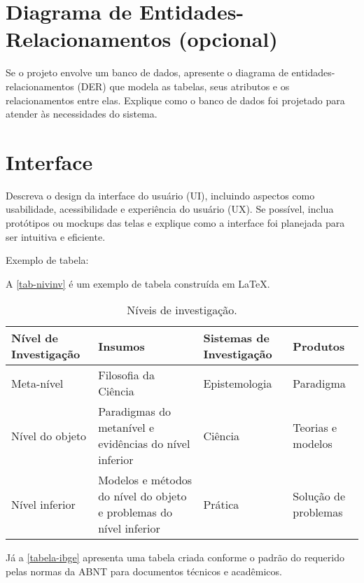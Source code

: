 \section{Diagrama de Entidades-Relacionamentos (opcional)}
Se o projeto envolve um banco de dados, apresente o diagrama de entidades-relacionamentos (DER) que modela as tabelas, seus atributos e os relacionamentos entre elas. Explique como o banco de dados foi projetado para atender às necessidades do sistema.

\section{Interface}

Descreva o design da interface do usuário (UI), incluindo aspectos como usabilidade, acessibilidade e experiência do usuário (UX). Se possível, inclua protótipos ou mockups das telas e explique como a interface foi planejada para ser intuitiva e eficiente.

Exemplo de tabela:

A \autoref{tab-nivinv} é um exemplo de tabela construída em
\LaTeX.

\begin{table}[htb]
\ABNTEXfontereduzida
\caption[Níveis de investigação]{Níveis de investigação.}
\label{tab-nivinv}
\begin{tabular}{p{2.6cm}|p{6.0cm}|p{2.25cm}|p{3.40cm}}
   \textbf{Nível de Investigação} & \textbf{Insumos}  & \textbf{Sistemas de Investigação}  & \textbf{Produtos}  \\
    \hline
    Meta-nível & Filosofia\index{filosofia} da Ciência  & Epistemologia &
    Paradigma  \\
    \hline
    Nível do objeto & Paradigmas do metanível e evidências do nível inferior &
    Ciência  & Teorias e modelos \\
    \hline
    Nível inferior & Modelos e métodos do nível do objeto e problemas do nível inferior & Prática & Solução de problemas  \\
\end{tabular}
\end{table}

Já a \autoref{tabela-ibge} apresenta uma tabela criada conforme o padrão do
\textcite{macedo2005} requerido pelas normas da ABNT para documentos técnicos e
acadêmicos.

